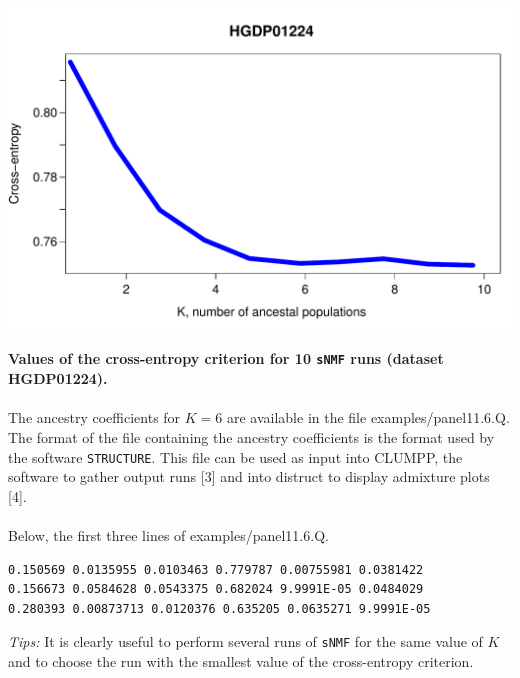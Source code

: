 \documentclass[10pt,a4paper]{article}
\begin{document}
\centerline{\includegraphics[width=15cm]{ce.pdf}}
  {\bf Values of the cross-entropy criterion for 10 {\tt sNMF} runs (dataset HGDP01224).} 
\\
\\

\noindent
The ancestry coefficients for $K=6$ are available in the file examples/panel11.6.Q. The format of the file containing the ancestry coefficients is the format used by the software {\tt STRUCTURE}. This file can be used as input into CLUMPP, the software to gather output runs [3] and into distruct to display admixture plots [4].\\
\\
\noindent
Below, the first three lines of examples/panel11.6.Q.
\begin{center}
\footnotesize
\begin{Verbatim}[frame=single]
0.150569 0.0135955 0.0103463 0.779787 0.00755981 0.0381422
0.156673 0.0584628 0.0543375 0.682024 9.9991E-05 0.0484029
0.280393 0.00873713 0.0120376 0.635205 0.0635271 9.9991E-05
\end{Verbatim}
\end{center}
{\it Tips:} It is clearly useful to perform several runs of {\tt sNMF} for the same value of $K$ and to choose the run with the smallest value of the cross-entropy criterion.
\end{document}
